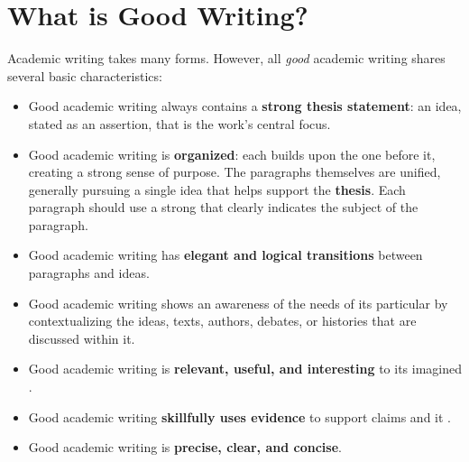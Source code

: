 
\hypertarget{good-writing}{}

\chapter{What is Good Writing?}


Academic writing takes many forms. However, all \emph{good} academic writing shares several basic characteristics:

\begin{itemize}

\item Good academic writing always contains a \textbf{strong thesis statement}: an idea, stated as an assertion, that is the work's central focus.
\item Good academic writing is \textbf{organized}: each \hyperlink{organization}{\color{Ahrenge}{paragraph}} builds upon the one before it, creating a strong sense of purpose. The paragraphs themselves are unified, generally pursuing a single idea that helps support the \textbf{thesis}. Each paragraph should use a strong \hyperlink{organization}{\color{Ahrenge}{topic sentence}} that clearly indicates the subject of the paragraph.
\item Good academic writing has \textbf{elegant and logical transitions} between paragraphs and ideas.
\item Good academic writing shows an awareness of the needs of its particular \hyperlink{audience}{\color{Ahrenge}{audience}} by contextualizing the ideas, texts, authors, debates, or histories that are discussed within it.
\item Good academic writing is \textbf{relevant, useful, and interesting} to its imagined \hyperlink{audience}{\color{Ahrenge}{audience}}.
\item Good academic writing \textbf{skillfully uses evidence} to support claims and it \hyperlink{sources}{\color{Ahrenge}{properly credits outside sources with citations}}.
\item Good academic writing is \textbf{precise, clear, and concise}.

\end{itemize}

